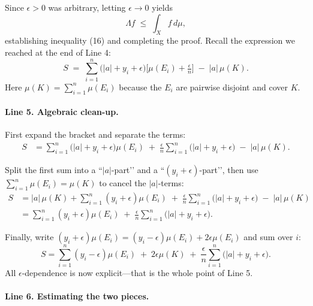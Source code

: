 \documentclass[12pt]{article}
\theoremstyle{definition} %
\theoremstyle{plain} %
\begin{document}
  Since $\epsilon>0$ was arbitrary, letting $\epsilon\to0$ yields
  \[
    \Lambda f\;\le\;\int_{X}f\,d\mu,
  \]
  establishing inequality (16) and completing the proof.
  \pagebreak
Recall the expression we reached at the end of Line 4:
\[
  S
  \;=\;
  \sum_{i=1}^{n}\bigl(|a|+y_i+\epsilon\bigr)\bigl[\mu(E_i)+\tfrac{\epsilon}{n}\bigr]
  \;-\;|a|\,\mu(K).
\]
Here $\mu(K)=\sum_{i=1}^{n}\mu(E_i)$ because the $E_i$ are pairwise
disjoint and cover $K$.

\paragraph{Line 5.  Algebraic clean-up.}
First expand the bracket and separate the terms:
\begin{align*}
S
&=
  \sum_{i=1}^{n}\bigl(|a|+y_i+\epsilon\bigr)\mu(E_i)
  \;+\;
  \frac{\epsilon}{n}\sum_{i=1}^{n}\bigl(|a|+y_i+\epsilon\bigr)
  \;-\;
  |a|\,\mu(K).
\end{align*}

\noindent
Split the first sum into a ``$|a|$-part’’ and a ``$(y_i+\epsilon)$-part’’,
then use $\sum_{i=1}^{n}\mu(E_i)=\mu(K)$ to cancel the $|a|$-terms:
\begin{align*}
S
&=
  |a|\,\mu(K)+\sum_{i=1}^{n}(y_i+\epsilon)\mu(E_i)
  \;+\;
  \frac{\epsilon}{n}\sum_{i=1}^{n}\bigl(|a|+y_i+\epsilon\bigr)
  \;-\;
  |a|\,\mu(K)
\\[4pt]
&=
  \sum_{i=1}^{n}(y_i+\epsilon)\mu(E_i)
  \;+\;
  \frac{\epsilon}{n}\sum_{i=1}^{n}\bigl(|a|+y_i+\epsilon\bigr).
\end{align*}

\noindent
Finally, write
\(
  (y_i+\epsilon)\mu(E_i)
  =(y_i-\epsilon)\mu(E_i) + 2\epsilon\mu(E_i)
\)
and sum over $i$:
\[
  S
  =
  \sum_{i=1}^{n}(y_i-\epsilon)\mu(E_i)
  \;+\;
  2\epsilon\mu(K)
  \;+\;
  \frac{\epsilon}{n}\sum_{i=1}^{n}\bigl(|a|+y_i+\epsilon\bigr).
\]
All $\epsilon$-dependence is now explicit—that is the whole point of
Line 5.

\paragraph{Line 6.  Estimating the two pieces.}
\end{document}

